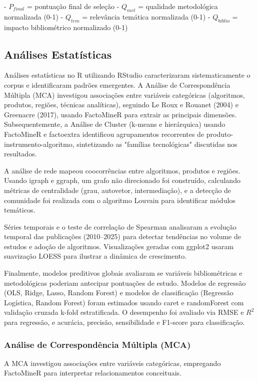 - \(P_{final}\) = pontuação final de seleção
- \(Q_{met}\) = qualidade metodológica normalizada (0-1)
- \(Q_{tem}\) = relevância temática normalizada (0-1)
- \(Q_{biblio}\) = impacto bibliométrico normalizado (0-1)

\subsection{Análises Estatísticas}

Análises estatísticas no R utilizando RStudio caracterizaram sistematicamente o corpus e identificaram padrões emergentes. A Análise de Correspondência Múltipla (MCA) investigou associações entre variáveis categóricas (algoritmos, produtos, regiões, técnicas analíticas), seguindo Le Roux e Rouanet (2004) e Greenacre (2017), usando FactoMineR para extrair as principais dimensões. Subsequentemente, a Análise de Cluster (k-means e hierárquica) usando FactoMineR e factoextra identificou agrupamentos recorrentes de produto-instrumento-algoritmo, sintetizando as "famílias tecnológicas" discutidas nos resultados.

A análise de rede mapeou coocorrências entre algoritmos, produtos e regiões. Usando igraph e ggraph, um grafo não direcionado foi construído, calculando métricas de centralidade (grau, autovetor, intermediação), e a detecção de comunidade foi realizada com o algoritmo Louvain para identificar módulos temáticos.

Séries temporais e o teste de correlação de Spearman analisaram a evolução temporal das publicações (2010–2025) para detectar tendências no volume de estudos e adoção de algoritmos. Visualizações geradas com ggplot2 usaram suavização LOESS para ilustrar a dinâmica de crescimento.

Finalmente, modelos preditivos globais avaliaram se variáveis bibliométricas e metodológicas poderiam antecipar pontuações de estudo. Modelos de regressão (OLS, Ridge, Lasso, Random Forest) e modelos de classificação (Regressão Logística, Random Forest) foram estimados usando caret e randomForest com validação cruzada k-fold estratificada. O desempenho foi avaliado via RMSE e \(R^2\) para regressão, e acurácia, precisão, sensibilidade e F1-score para classificação.

\subsubsection{Análise de Correspondência Múltipla (MCA)}

A MCA investigou associações entre variáveis categóricas, empregando FactoMineR para interpretar relacionamentos conceituais.

